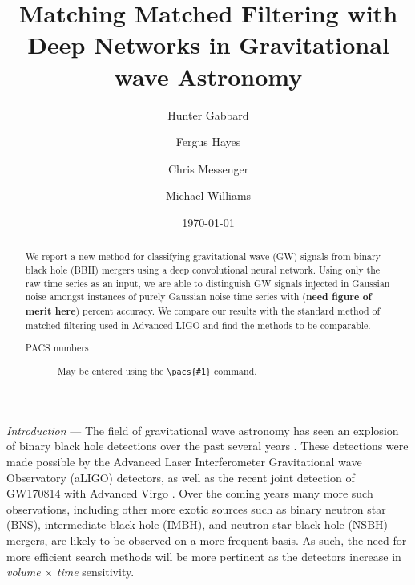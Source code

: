 \documentclass[%
 amsmath,amssymb,
 aps,
 twocolumn,
 prl,
 reprint,
floatfix,
]{revtex4-1}
\begin{document}

\title{Matching Matched Filtering with Deep Networks in Gravitational wave Astronomy}

\author{Hunter Gabbard}
\author{Fergus Hayes}
\author{Chris Messenger}
\author{Michael Williams}

\date{\today}%

\begin{abstract}
 We report a new method for classifying gravitational-wave (GW) signals from binary black hole (BBH) mergers using a deep convolutional neural network. Using only the raw time series as an input, we are able to distinguish GW signals injected in Gaussian noise amongst instances of purely Gaussian noise time series with (\textbf{need figure of merit here}) percent accuracy. We compare our results with the standard method of matched filtering used in Advanced LIGO and find the methods to be comparable.  
\begin{description}
\item[PACS numbers]
May be entered using the \verb+\pacs{#1}+ command.
\end{description}
\end{abstract}

\maketitle



\textit{Introduction} --- The field of gravitational wave astronomy has seen an explosion of binary black hole detections over the past several years \cite{PhysRevLett.116.061102, PhysRevLett.116.241103, PhysRevLett.118.221101}. These detections were made possible by the Advanced Laser Interferometer Gravitational wave Observatory (aLIGO) detectors, as well as the recent joint detection of GW170814 with Advanced Virgo \cite{PhysRevLett.119.141101}. Over the coming years many more such observations, including other more exotic sources such as binary neutron star (BNS), intermediate black hole (IMBH), and neutron star black hole (NSBH) mergers, are likely to be observed on a more frequent basis. As such, the need for more efficient search methods will be more pertinent as the detectors increase in \textit{volume} $\times$ \textit{time} sensitivity.
\end{document}
